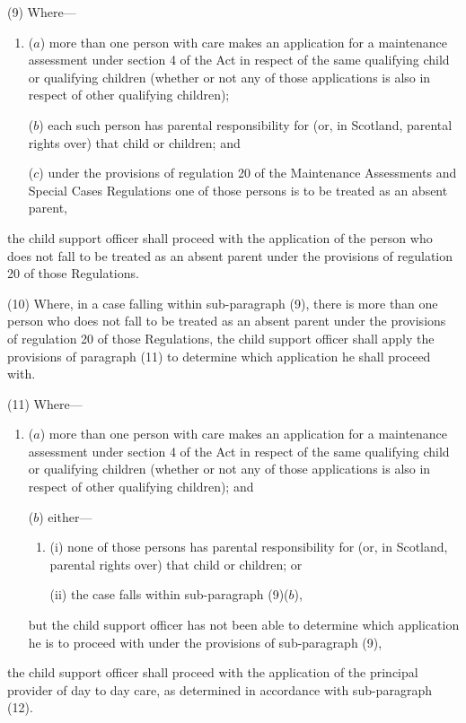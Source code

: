 \documentclass[a4paper]{article}
\begin{document}
(9) Where—
\begin{enumerate}\item[]
($a$) more than one person with care makes an application for a maintenance assessment under section 4 of the Act in respect of the same qualifying child or qualifying children (whether or not any of those applications is also in respect of other qualifying children);

\begin{sloppypar}
($b$) each such person has parental responsibility for (or, in Scotland, parental rights over) that child or children; and
\end{sloppypar}

($c$) under the provisions of regulation 20 of the Maintenance Assessments and Special Cases Regulations one of those persons is to be treated as an absent parent,
\end{enumerate}
the child support officer shall proceed with the application of the person who does not fall to be treated as an absent parent under the provisions of regulation 20 of those Regulations.

(10) Where, in a case falling within sub-paragraph (9), there is more than one person who does not fall to be treated as an absent parent under the provisions of regulation 20 of those Regulations, the child support officer shall apply the provisions of paragraph (11) to determine which application he shall proceed with.

(11) Where—
\begin{enumerate}\item[]
($a$) more than one person with care makes an application for a maintenance assessment under section 4 of the Act in respect of the same qualifying child or qualifying children (whether or not any of those applications is also in respect of other qualifying children); and

($b$) either—
\begin{enumerate}\item[]
(i) none of those persons has parental responsibility for (or, in Scotland, parental rights over) that child or children; or

(ii) the case falls within sub-paragraph (9)($b$),
\end{enumerate}
but the child support officer has not been able to determine which application he is to proceed with under the provisions of sub-paragraph (9),
\end{enumerate}
the child support officer shall proceed with the application of the principal provider of day to day care, as determined in accordance with sub-paragraph (12).
\end{document}
